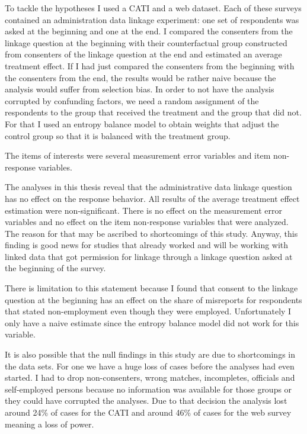 To tackle the hypotheses I used a CATI and a web dataset. Each of these surveys contained an administration data linkage experiment: one set of respondents was asked at the beginning and one at the end. I compared the consenters from the linkage question at the beginning with their counterfactual group constructed from consenters of the linkage question at the end and estimated an average treatment effect. If I had just compared the consenters from the beginning with the consenters from the end, the results would be rather naive because the analysis would suffer from selection bias. In order to not have the analysis corrupted by confunding factors, we need a random assignment of the respondents to the group that received the treatment and the group that did not. For that I used an entropy balance model to obtain weights that adjust the control group so that it is balanced with the treatment group. 

The items of interests were several measurement error variables and item non-response variables.

The analyses in this thesis reveal that the administrative data linkage question has no effect on the response behavior. All results of the average treatment effect estimation were non-significant. There is no effect on the measurement error variables and no effect on the item non-response variables that were analyzed. The reason for that may be ascribed to shortcomings of this study. Anyway, this finding is good news for studies that already worked and will be working with linked data that got permission for linkage through a linkage question asked at the beginning of the survey. 

There is limitation to this statement because I found that consent to the linkage question at the beginning has an effect on the share of misreports for respondents that stated non-employment even though they were employed. Unfortunately I only have a naive estimate since the entropy balance model did not work for this variable.

It is also possible that the null findings in this study are due to shortcomings in the data sets. For one we have a huge loss of cases before the analyses had even started. I had to drop non-consenters, wrong matches, incompletes, officials and self-employed persons because no information was available for those groups or they could have corrupted the analyses. Due to that decision the analysis lost around 24\% of cases for the CATI and around 46\% of cases for the web survey meaning a loss of power. 

